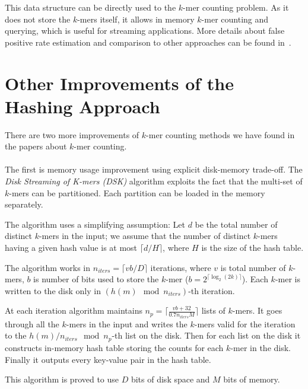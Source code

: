 This data structure can be directly used to the $k$-mer counting problem. As it does not store the $k$-mers itself, it allows in memory $k$-mer counting and querying, which is useful for streaming applications.
More details about false positive rate estimation and comparison to other approaches can be found in~\cite{khmer}.

\section{Other Improvements of the Hashing Approach}

There are two more improvements of $k$-mer counting methods we have found in the papers about $k$-mer counting.

\paragraph{} The first is memory usage improvement using explicit disk-memory trade-off. The \emph{Disk Streaming of K-mers (DSK)} algorithm\cite{dsk} exploits the fact that the multi-set of $k$-mers can be partitioned. Each partition can be loaded in the memory separately.

The algorithm uses a simplifying assumption: Let $d$ be the total number of distinct $k$-mers in the input; we assume that the number of distinct $k$-mers having a given hash value is at most $\lceil d/H \rceil$, where $H$ is the size of the hash table\cite{dsk}.

The algorithm works in $n_{iters} = \lceil vb/D\rceil$ iterations, where $v$ is total number of $k$-mers, $b$ is number of bits used to store the $k$-mer ($b = 2^{\lceil\log_2(2k)\rceil}$). Each $k$-mer is written to the disk only in $(h(m) \mod n_{iters})$-th iteration.

At each iteration algorithm maintains $n_p = \lceil\frac{vb+32}{0.7n_{iters}M}\rceil$ lists of $k$-mers.
It goes through all the $k$-mers in the input and writes the $k$-mers valid for the iteration to the $h(m)/n_{iters} \mod n_p$-th list on the disk.
Then for each list on the disk it constructs in-memory hash table storing the counts for each $k$-mer in the disk.
Finally it outputs every key-value pair in the hash table.

This algorithm is proved to use $D$ bits of disk space and $M$ bits of memory\cite{dsk}.


